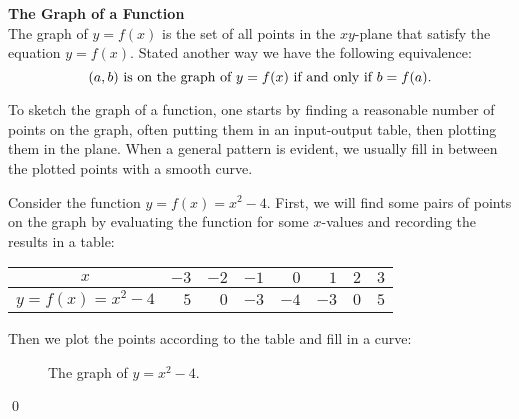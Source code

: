 \begin{tcolorbox}
{\bf The Graph of a Function}\\
The graph of $y = f(x)$ is the set of all points in the $xy$-plane that satisfy the equation $y=f(x)$. Stated another way we have the following equivalence:
\[
(a,b)\ \mbox{is on the graph of\ }\\ y=f(x)\ \mbox{if and only if}\ b = f(a).
\]
\end{tcolorbox}
To sketch the graph of a function, one starts by finding a reasonable number of points on the graph, often putting them in an input-output table, then plotting them in the plane. When a general pattern is evident, we usually fill in between the plotted points with a smooth curve.

\par

\begin{eg} Consider the function $y = f(x) = x^2-4$. First, we will find some pairs of points on the graph by evaluating the function for some $x$-values and recording the results in a table:\\
\begin{center}
\begin{tabular}{c || r|r|r|r|r|r|r|}
$x$ & $-3$ & $-2$ & $-1$ & $0$ & $1$ & $2$ & $3$ \\ 
\hline $y = f(x) = x^2-4$ & $5$ & $0$ & $-3$ & $-4$ & $-3$ & $0$ & $5$\\
\hline
\end{tabular}
\end{center}

Then we plot the points according to the table and fill in a curve: \\

\begin{figure}[h]
\centering
{} 
\caption{The graph of $y = x^2-4$.}
\end{figure}

\qed \end{eg}


